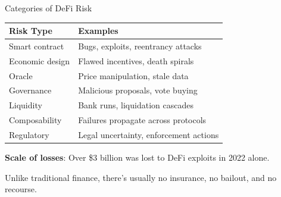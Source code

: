\documentclass[10pt]{beamer}
\begin{document}
\begin{frame}{Categories of DeFi Risk}
  \begin{center}
  \begin{tabular}{lp{6cm}}
    \toprule
    \textbf{Risk Type} & \textbf{Examples} \\
    \midrule
    Smart contract & Bugs, exploits, reentrancy attacks \\
    Economic design & Flawed incentives, death spirals \\
    Oracle & Price manipulation, stale data \\
    Governance & Malicious proposals, vote buying \\
    Liquidity & Bank runs, liquidation cascades \\
    Composability & Failures propagate across protocols \\
    Regulatory & Legal uncertainty, enforcement actions \\
    \bottomrule
  \end{tabular}
  \end{center}
  
  \vspace{1em}
  \textbf{Scale of losses}: Over \$3 billion was lost to DeFi exploits in 2022 alone.
  
  \vspace{0.5em}
  Unlike traditional finance, there's usually no insurance, no bailout, and no recourse.
\end{frame}
\end{document}
